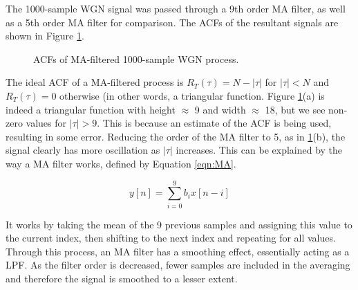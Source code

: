 The 1000-sample WGN signal was passed through a 9th order MA filter, as well as a 5th order MA filter for comparison. The ACFs of the resultant signals are shown in Figure \ref{fig:triang}.

\begin{figure}[H]
    \centering
    \caption{ACFs of MA-filtered 1000-sample WGN process.}
    \label{fig:triang}
\end{figure}

\noindent
The ideal ACF of a MA-filtered process is $R_{T}(\tau) = N-|\tau|$ for $|\tau| < N$ and $R_{T}(\tau) =0$ otherwise (in other words, a triangular function. Figure \ref{fig:triang}(a) is indeed a triangular function with height  $\approx$ 9 and width $\approx$ 18, but we see non-zero values for $|\tau|>9$. This is because an estimate of the ACF is being used, resulting in some error. Reducing the order of the MA filter to 5, as in \ref{fig:triang}(b), the signal clearly has more oscillation as $|\tau|$ increases. This can be explained by the way a MA filter works, defined by Equation \ref{eqn:MA}.

\begin{equation}
y[n]=\sum_{i=0}^{9} b_{i} x[n-i]
\label{eqn:MA}
\end{equation}

\noindent
It works by taking the mean of the 9 previous samples and assigning this value to the current index, then shifting to the next index and repeating for all values. Through this process, an MA filter has a smoothing effect, essentially acting as a LPF. As the filter order is decreased, fewer samples are included in the averaging and therefore the signal is smoothed to a lesser extent.

